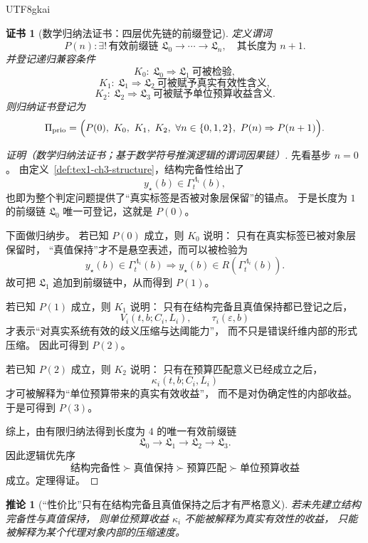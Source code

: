 \documentclass[12pt]{article}
\newtheorem{corollary}{推论}[section]
\newtheorem{Certificate}{证书}[section]
\begin{document}
\begin{CJK*}{UTF8}{gkai}
\begin{Certificate}[数学归纳法证书：四层优先链的前缀登记]
\label{cert:tex1-ch3-priority}
定义谓词
\[
  P(n):
  \exists!\,\text{有效前缀链 }\mathfrak L_0\to\cdots\to \mathfrak L_n,
  \quad
  \text{其长度为 }n+1.
\]
并登记递归兼容条件
\[
  K_0:\ \mathfrak L_0\Rightarrow \mathfrak L_1\ \text{可被检验},
\]
\[
  K_1:\ \mathfrak L_1\Rightarrow \mathfrak L_2\ \text{可被赋予真实有效性含义},
\]
\[
  K_2:\ \mathfrak L_2\Rightarrow \mathfrak L_3\ \text{可被赋予单位预算收益含义}.
\]
则归纳证书登记为
\[
  \Pi_{\mathrm{prio}}
  =
  \Bigl(
    P(0),\
    K_0,\
    K_1,\
    K_2,\
    \forall n\in\{0,1,2\},\ P(n)\Rightarrow P(n+1)
  \Bigr).
\]
\end{Certificate}

\begin{proof}[证明（数学归纳法证书；基于数学符号推演逻辑的谓词因果链）]
先看基步 $n=0$。
由定义~\ref{def:tex1-ch3-structure}，结构完备性给出了
\[
  y_\star(b)\in \Gamma_t^{\Lambda_i}(b),
\]
也即为整个判定问题提供了“真实标签是否被对象层保留”的锚点。
于是长度为 $1$ 的前缀链 $\mathfrak L_0$ 唯一可登记，这就是 \(P(0)\)。

下面做归纳步。
若已知 \(P(0)\) 成立，则 \(K_0\) 说明：
只有在真实标签已被对象层保留时，
“真值保持”才不是悬空表述，而可以被检验为
\[
  y_\star(b)\in \Gamma_t^{\Lambda_i}(b)
  \Rightarrow
  y_\star(b)\in R(\Gamma_t^{\Lambda_i}(b)).
\]
故可把 $\mathfrak L_1$ 追加到前缀链中，从而得到 \(P(1)\)。

若已知 \(P(1)\) 成立，则 \(K_1\) 说明：
只有在结构完备且真值保持都已登记之后，
\[
  V_i(t,b;C_i,L_i),\qquad \tau_i(\varepsilon,b)
\]
才表示“对真实系统有效的歧义压缩与达阈能力”，
而不只是错误纤维内部的形式压缩。
因此可得到 \(P(2)\)。

若已知 \(P(2)\) 成立，则 \(K_2\) 说明：
只有在预算匹配意义已经成立之后，
\[
  \kappa_i(t,b;C_i,L_i)
\]
才可被解释为“单位预算带来的真实有效收益”，
而不是对伪确定性的内部收益。
于是可得到 \(P(3)\)。

综上，由有限归纳法得到长度为 $4$ 的唯一有效前缀链
\[
  \mathfrak L_0\to \mathfrak L_1\to \mathfrak L_2\to \mathfrak L_3.
\]
因此逻辑优先序
\[
  \text{结构完备性}
  \succ
  \text{真值保持}
  \succ
  \text{预算匹配}
  \succ
  \text{单位预算收益}
\]
成立。定理得证。
\end{proof}

\begin{corollary}[“性价比”只有在结构完备且真值保持之后才有严格意义]
\label{cor:tex1-ch3-priority}
若未先建立结构完备性与真值保持，
则单位预算收益 $\kappa_i$ 不能被解释为真实有效性的收益，
只能被解释为某个代理对象内部的压缩速度。
\end{corollary}


\end{CJK*}
\end{document}
